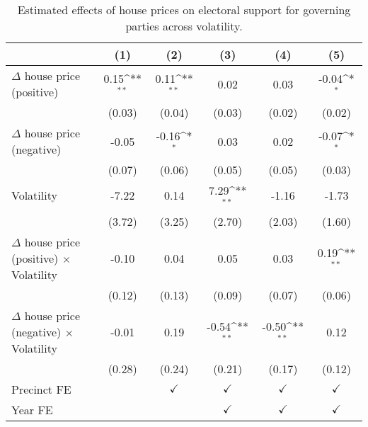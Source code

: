 \begin{table}[htbp]\centering
\def\sym#1{\ifmmode^{#1}\else\(^{#1}\)\fi}
\caption{Estimated effects of house prices on electoral support for governing parties across volatility.} \label{tab6}
\begin{tabular}{l*{5}{c}}
\hline\hline
                    &\multicolumn{1}{c}{(1)}        &\multicolumn{1}{c}{(2)}        &\multicolumn{1}{c}{(3)}        &\multicolumn{1}{c}{(4)}        &\multicolumn{1}{c}{(5)}        \\
\hline
$\Delta$ house price (positive)&        0.15\sym{**}&        0.11\sym{**}&        0.02        &        0.03        &       -0.04\sym{*} \\
                    &      (0.03)        &      (0.04)        &      (0.03)        &      (0.02)        &      (0.02)        \\
[1em]
$\Delta$ house price (negative)&       -0.05        &       -0.16\sym{*} &        0.03        &        0.02        &       -0.07\sym{*} \\
                    &      (0.07)        &      (0.06)        &      (0.05)        &      (0.05)        &      (0.03)        \\
[1em]
Volatility          &       -7.22        &        0.14        &        7.29\sym{**}&       -1.16        &       -1.73        \\
                    &      (3.72)        &      (3.25)        &      (2.70)        &      (2.03)        &      (1.60)        \\
[1em]
$\Delta$ house price (positive) $\times$ Volatility&       -0.10        &        0.04        &        0.05        &        0.03        &        0.19\sym{**}\\
                    &      (0.12)        &      (0.13)        &      (0.09)        &      (0.07)        &      (0.06)        \\
[1em]
$\Delta$ house price (negative) $\times$ Volatility&       -0.01        &        0.19        &       -0.54\sym{**}&       -0.50\sym{**}&        0.12        \\
                    &      (0.28)        &      (0.24)        &      (0.21)        &      (0.17)        &      (0.12)        \\
[1em]
\hline Precinct FE  &                    &$\checkmark$        &$\checkmark$        &$\checkmark$        &$\checkmark$        \\
[1em]
Year FE             &                    &                    &$\checkmark$        &$\checkmark$        &$\checkmark$        \\

\end{tabular}
\end{table}
